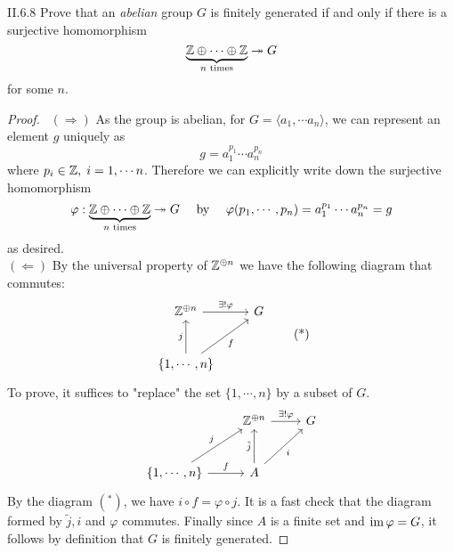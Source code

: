 \begin{problem}{II.6.8}
Prove that an \emph{abelian} group $G$ is finitely generated if and only if there is a surjective homomorphism
\[
    \underbrace{\mathbb{Z} \oplus \cdots \oplus \mathbb{Z}}_{n \text{ times}}\twoheadrightarrow G   
\]
for some $n$.
\end{problem}
\begin{proof} \
$(\Rightarrow)$ As the group is abelian, for $G = \langle a_1, \cdots a_n \rangle$, we can represent an element $g$ uniquely as
\[
    g = a_1^{p_1} \cdots a_n^{p_n}    
\]
where $p_i\in \mathbb{Z}, \; i = 1, \cdots n$. Therefore we can explicitly write down the surjective homomorphism
\[
\varphi : \underbrace{\mathbb{Z} \oplus \cdots \oplus \mathbb{Z}}_{n \text{ times}}\twoheadrightarrow G \quad \text{ by } \quad \varphi(p_1,\cdots ,p_n) = a_1^{p_1} \cdots a_n^{p_n} = g      
\]
as desired. \\
$(\Leftarrow)$ By the universal property of $\mathbb{Z}^{\oplus n}$ we have the following diagram that commutes:
\[
\begin{tikzcd}[row sep=large]
\Z^{\oplus n} \arrow[r, "\exists ! \varphi"] &G \\
\{1,\cdots,n\} \arrow[u, "j"] \arrow[ur, "f"']
\end{tikzcd}
\tag{*} 
\]
To prove, it suffices to "replace" the set $\{1,\cdots,n\}$ by a subset of $G$.
\[
\begin{tikzcd}[row sep=large]
& \Z^{\oplus n} \arrow[r, "\exists ! \varphi"] & G \\
{\{1,\cdots,n\}} \arrow[r, "f"] \arrow[ru, "j"] & A \arrow[u, "\tilde{j}"] \arrow[ru, "i"']    &  
\end{tikzcd}
\]
By the diagram $(^*)$, we have $i \circ f = \varphi \circ j$. It is a fast check that the diagram formed by $\tilde{j}, i$ and $\varphi$ commutes. Finally since $A$ is a finite set and $\operatorname{im} \varphi = G$, it follows by definition that $G$ is finitely generated.
\end{proof}

